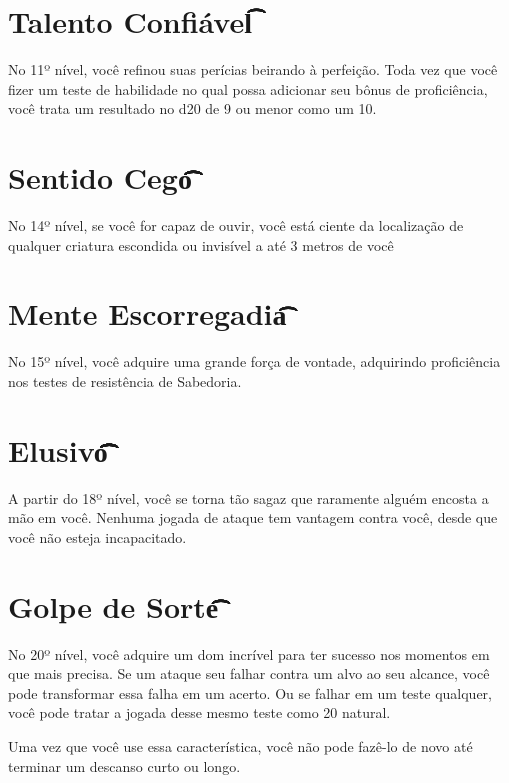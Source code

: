 \documentclass{RPG_Adventure}[2021/10/20]
\begin{document}
\section*{Talento Confiável\t\t\t\t\t\t\t}%
\label{sec:talento_confiavel}

No 11º nível, você refinou suas perícias beirando à perfeição. Toda vez que você
fizer um teste de habilidade no qual possa adicionar seu bônus de proficiência,
você trata um resultado no d20 de 9 ou menor como um 10.

\section*{Sentido Cego\t\t\t\t\t\t\t\t\t\t}%
\label{sec:sentido_cego}

No 14º nível, se você for capaz de ouvir, você está ciente da localização de
qualquer criatura escondida ou invisível a até 3 metros de você

\section*{Mente Escorregadia\t\t\t\t\t\t}%
\label{sec:mente_escorregadia}

No 15º nível, você adquire uma grande força de vontade, adquirindo proficiência
nos testes de resistência de Sabedoria.

\section*{Elusivo\t\t\t\t\t\t\t\t\t\t\t\t\t\t}%
\label{sec:elusivo}

A partir do 18º nível, você se torna tão sagaz que raramente alguém encosta a
mão em você. Nenhuma jogada de ataque tem vantagem contra você, desde que você
não esteja incapacitado.

\section*{Golpe de Sorte\t\t\t\t\t\t\t\t\t}%
\label{sec:golpe_de_sorte}

No 20º nível, você adquire um dom incrível para ter sucesso nos momentos em que
mais precisa. Se um ataque seu falhar contra um alvo ao seu alcance, você pode
transformar essa falha em um acerto. Ou se falhar em um teste qualquer, você
pode tratar a jogada desse mesmo teste como 20 natural.

Uma vez que você use essa característica, você não pode fazê-lo de novo até
terminar um descanso curto ou longo.
\end{document}
